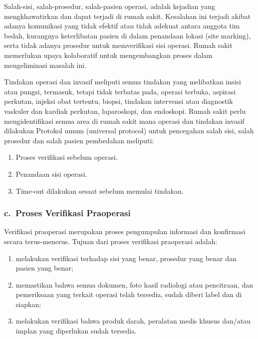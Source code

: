\documentclass[
]{book}
\providecommand{\tightlist}{%
  \setlength{\itemsep}{0pt}\setlength{\parskip}{0pt}}
\begin{document}
Salah-sisi, salah-prosedur, salah-pasien operasi, adalah kejadian yang mengkhawatirkan dan dapat terjadi di rumah sakit. Kesalahan ini terjadi akibat adanya komunikasi yang tidak efektif atau tidak adekuat antara anggota tim bedah, kurangnya keterlibatan pasien di dalam penandaan lokasi (site marking), serta tidak adanya prosedur untuk memverifikasi sisi operasi. Rumah sakit memerlukan upaya kolaboratif untuk mengembangkan proses dalam mengeliminasi masalah ini.

Tindakan operasi dan invasif meliputi semua tindakan yang melibatkan insisi atau pungsi, termasuk, tetapi tidak terbatas pada, operasi terbuka, aspirasi perkutan, injeksi obat tertentu, biopsi, tindakan intervensi atau diagnostik vaskuler dan kardiak perkutan, laparoskopi, dan endoskopi. Rumah sakit perlu mengidentifikasi semua area di rumah sakit mana operasi dan tindakan invasif dilakukan Protokol umum (universal protocol) untuk pencegahan salah sisi, salah prosedur dan salah pasien pembedahan meliputi:

\begin{enumerate}
\def\labelenumi{\arabic{enumi}.}
\tightlist
\item
  Proses verifikasi sebelum operasi.
\item
  Penandaan sisi operasi.
\item
  Time-out dilakukan sesaat sebelum memulai tindakan.
\end{enumerate}

\hypertarget{c.-proses-verifikasi-praoperasi}{%
\subsubsection*{c.~Proses Verifikasi Praoperasi}\label{c.-proses-verifikasi-praoperasi}}

Verifikasi praoperasi merupakan proses pengumpulan informasi dan konfirmasi secara terus-menerus. Tujuan dari proses verifikasi praoperasi adalah:

\begin{enumerate}
\def\labelenumi{\arabic{enumi}.}
\tightlist
\item
  melakukan verifikasi terhadap sisi yang benar, prosedur yang benar dan pasien yang benar;
\item
  memastikan bahwa semua dokumen, foto hasil radiologi atau pencitraan, dan pemeriksaan yang terkait operasi telah tersedia, sudah diberi label dan di siapkan;
\item
  melakukan verifikasi bahwa produk darah, peralatan medis khusus dan/atau implan yang diperlukan sudah tersedia.
\end{enumerate}
\end{document}
